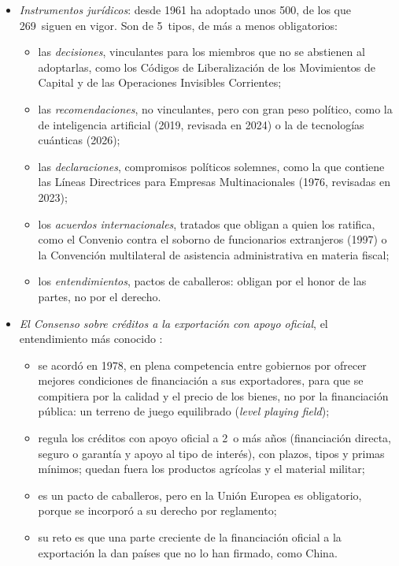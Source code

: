 \documentclass[11pt]{article}
\begin{document}
\begin{itemize}
\item \emph{Instrumentos jurídicos}: desde 1961 ha adoptado unos 500, de los que 269~siguen en vigor\nocite{OCDE2026Instrumentos}. Son de 5~tipos, de más a menos obligatorios:
  \begin{itemize}
  \item las \emph{decisiones}, vinculantes para los miembros que no se abstienen al adoptarlas, como los Códigos de Liberalización de los Movimientos de Capital y de las Operaciones Invisibles Corrientes;
  \item las \emph{recomendaciones}, no vinculantes, pero con gran peso político, como la de inteligencia artificial (2019, revisada en 2024) o la de tecnologías cuánticas (2026)\nocite{OCDE2026Instrumentos};
  \item las \emph{declaraciones}, compromisos políticos solemnes, como la que contiene las Líneas Directrices para Empresas Multinacionales (1976, revisadas en 2023)\nocite{OCDE2026Instrumentos};
  \item los \emph{acuerdos internacionales}, tratados que obligan a quien los ratifica, como el Convenio contra el soborno de funcionarios extranjeros (1997) o la Convención multilateral de asistencia administrativa en materia fiscal;
  \item los \emph{entendimientos}, pactos de caballeros: obligan por el honor de las partes, no por el derecho.
  \end{itemize}
\item \emph{El Consenso sobre créditos a la exportación con apoyo oficial}, el entendimiento más conocido :
  \begin{itemize}
  \item se acordó en 1978, en plena competencia entre gobiernos por ofrecer mejores condiciones de financiación a sus exportadores, para que se compitiera por la calidad y el precio de los bienes, no por la financiación pública: un terreno de juego equilibrado (\emph{level playing field});
  \item regula los créditos con apoyo oficial a 2~o más años (financiación directa, seguro o garantía y apoyo al tipo de interés), con plazos, tipos y primas mínimos; quedan fuera los productos agrícolas y el material militar;
  \item es un pacto de caballeros, pero en la Unión Europea es obligatorio, porque se incorporó a su derecho por reglamento\nocite{UE2011Reglamento1233};
  \item su reto es que una parte creciente de la financiación oficial a la exportación la dan países que no lo han firmado, como China.

\end{itemize}
\end{itemize}
\end{document}
